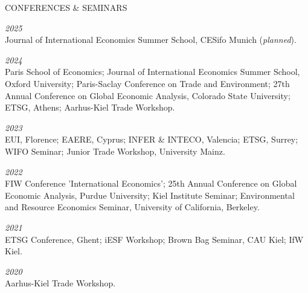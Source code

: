 \documentclass{article}
\begin{document}
\begin{minipage}[t]{0.12\textwidth}
    {\selectfont CONFERENCES \& SEMINARS} \\
\end{minipage}
\hspace{5mm}
\begin{minipage}[t]{0.8\textwidth}
    \textit{2025} \\
    Journal of International Economics Summer School, CESifo Munich (\textit{planned}). \par
    \textit{2024} \\
    Paris School of Economics; Journal of International Economics Summer School, Oxford University; Paris-Saclay Conference on Trade and Environment; 27th Annual Conference on Global Economic Analysis, Colorado State University; ETSG, Athens; Aarhus-Kiel Trade Workshop. \par
    \textit{2023} \\
    EUI, Florence; EAERE, Cyprus; INFER \& INTECO, Valencia; ETSG, Surrey; WIFO Seminar; Junior Trade Workshop, University Mainz. \par
    \textit{2022} \\
    FIW Conference 'International Economics'; 25th Annual Conference on Global Economic Analysis, Purdue University; Kiel Institute Seminar; Environmental and Resource Economics Seminar, University of California, Berkeley.  \par
    \textit{2021} \\
    ETSG Conference, Ghent; iESF Workshop; Brown Bag Seminar, CAU Kiel; IfW Kiel. \par
    \textit{2020} \\
    Aarhus-Kiel Trade Workshop. \par
\end{minipage}
\medskip

\end{document}
